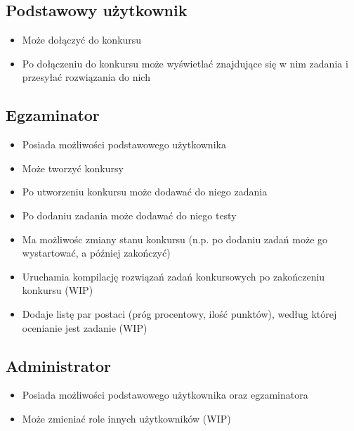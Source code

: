 \documentclass{article}
\begin{document}
\subsection{Podstawowy użytkownik}
\begin{itemize}
    \item Może dołączyć do konkursu
    \item Po dołączeniu do konkursu może wyświetlać znajdujące się w nim zadania i przesyłać rozwiązania do nich
\end{itemize}

\subsection{Egzaminator}
\begin{itemize}
    \item Posiada możliwości podstawowego użytkownika
    \item Może tworzyć konkursy
    \item Po utworzeniu konkursu może dodawać do niego zadania
    \item Po dodaniu zadania może dodawać do niego testy
    \item Ma możliwośc zmiany stanu konkursu (n.p. po dodaniu zadań może go wystartować, a później zakończyć)
    \item Uruchamia kompilację rozwiązań zadań konkursowych po zakończeniu konkursu (WIP)
    \item Dodaje listę par postaci (próg procentowy, ilość punktów), według której ocenianie jest zadanie (WIP)
\end{itemize}

\subsection{Administrator}
\begin{itemize}
    \item Posiada możliwości podstawowego użytkownika oraz egzaminatora
    \item Może zmieniać role innych użytkowników (WIP)
\end{itemize}
\end{document}
